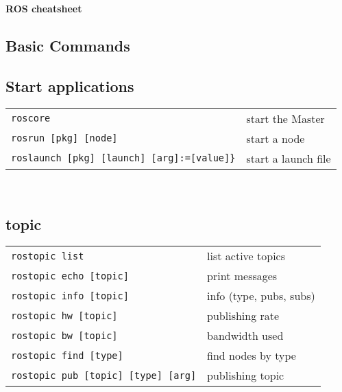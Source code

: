\documentclass[10pt,landscape,a4paper]{article}
\begin{document}
    \raggedright
    \footnotesize
    
    \begin{center}
         \Large{\textbf{ROS cheatsheet}} \\
    \end{center}
    
    \begin{multicols}{3}
    

        \section{Basic Commands}

        \subsection{Start applications}
            \begin{tabular}{@{}ll@{}}
                \verb!roscore!    & start the Master \\
                \verb!rosrun [pkg] [node]!    & start a node \\
                \verb!roslaunch [pkg] [launch] [arg]:=[value]}!    & start a launch file \\
            \end{tabular} \\
                
                
        \subsection{topic}
            \begin{tabular}{@{}ll@{}}
                \verb!rostopic list!    & list active topics \\
                \verb!rostopic echo [topic]!    & print messages \\
                \verb!rostopic info [topic]!    & info (type, pubs, subs) \\
                \verb!rostopic hw [topic]!    & publishing rate \\
                \verb!rostopic bw [topic]!    & bandwidth used \\
                \verb!rostopic find [type]!    & find nodes by type \\
                \verb!rostopic pub [topic] [type] [arg]!    & publishing topic \\
            \end{tabular} \\
    

\end{multicols}
\end{document}

